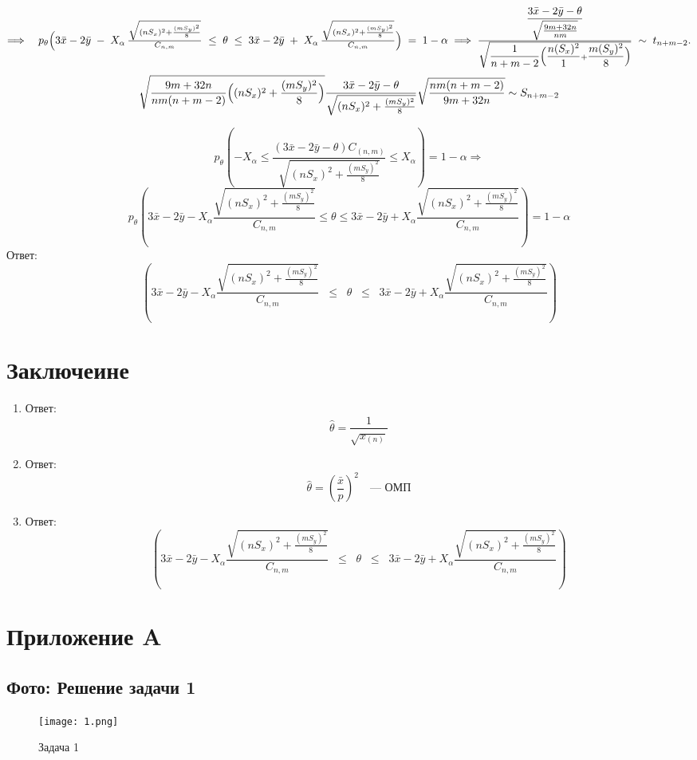 \documentclass[areasetadvanced]{scrartcl}
\begin{document}
\newpage

$ 
\Longrightarrow
\quad
p_\theta\Bigl(
  3\bar{x} - 2\bar{y}
  \;-\;
  X_\alpha
  \,\frac{\sqrt{(nS_x)^2 + \frac{(mS_y)^2}{8}}}{C_{n,m}}
  \;\le\;
  \theta
  \;\le\;
  3\bar{x} - 2\bar{y}
  \;+\;
  X_\alpha
  \,\frac{\sqrt{(nS_x)^2 + \frac{(mS_y)^2}{8}}}{C_{n,m}}
\Bigr)
\;=\;
1-\alpha
\;\Longrightarrow\;
\frac{
  \dfrac{3\bar{x}-2\bar{y}-\theta}{\sqrt{\frac{9m+32n}{nm}}}
}{
  \sqrt{
    \dfrac{1}{n+m-2}
    \Bigl(
      \dfrac{n(S_x)^2}{1}
      + \dfrac{m(S_y)^2}{8}
    \Bigr)
  }
}
\;\sim\;
t_{n+m-2}.
$
\[
\sqrt{\frac{9m+32n}{nm(n+m-2)}
      \Bigl((nS_x)^2 + \frac{(mS_y)^2}{8}\Bigr)}
\frac{3\bar{x} - 2\bar{y}-\theta}{\sqrt{(nS_x)^2 + \frac{(mS_y)^2}{8}}}
\sqrt{\frac{nm(n+m-2)}{9m+32n}}
\sim S_{n+m-2}
\]

\[
p_\theta (-X_\alpha \leq \frac{(3\bar{x} - 2\bar{y} - \theta)C_{(n,m)}}{\sqrt{(nS_x)^2 + \frac{(mS_y)^2}{8}}} \leq X_\alpha) = 1-\alpha
\Longrightarrow 
\]
\[
p_\theta(3\bar{x} - 2\bar{y} - X_\alpha \frac{\sqrt{(nS_x)^2 + \frac{(mS_y)^2}{8}}}{C_{n,m}} \leq \theta \leq 3\bar{x}-2\bar{y}+X_\alpha \frac{\sqrt{(nS_x)^2 + \frac{(mS_y)^2}{8}}}{C_{n,m}}) = 1-\alpha
\]
Ответ: \[
(3\bar{x} - 2\bar{y} - X_\alpha \frac{\sqrt{(nS_x)^2 + \frac{(mS_y)^2}{8}}}{C_{n,m}}
\;\;\leq\;\;
\theta
\;\;\leq\;\;
3\bar{x}-2\bar{y} + X_\alpha \frac{\sqrt{(nS_x)^2 + \frac{(mS_y)^2}{8}}}{C_{n,m}}
)
\]


\newpage
\section*{Заключеине}
\begin{enumerate}
	\item Ответ: \[ \hat{\theta} = \frac{1}{\sqrt{x_{(n)}}}\]
	\item Ответ: \[
\hat{\theta} = \left( \frac{\bar{x}}{p} \right)^2 \quad \text{— ОМП}
\]
	\item Ответ:\[
(3\bar{x} - 2\bar{y} - X_\alpha \frac{\sqrt{(nS_x)^2 + \frac{(mS_y)^2}{8}}}{C_{n,m}}
\;\;\leq\;\;
\theta
\;\;\leq\;\;
3\bar{x}-2\bar{y}+X_\alpha \frac{\sqrt{(nS_x)^2 + \frac{(mS_y)^2}{8}}}{C_{n,m}}
)
\]
\end{enumerate}
\newpage
\section*{Приложение A}
\subsection*{Фото: Решение задачи 1}
\begin{figure}[H]
    \centering
    \texttt{[image: 1.png]}
    \caption{Задача 1}
    \label{fig:syntdiag}
\end{figure}
\newpage
\end{document}

